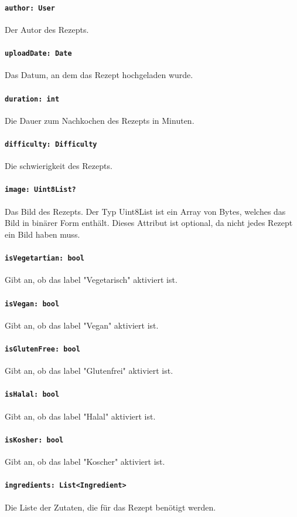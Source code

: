 \documentclass{entwurfsheft}
\begin{document}
\begin{sloppypar}
\paragraph{\texttt{author: User}}
Der Autor des Rezepts.
\paragraph{\texttt{uploadDate: Date}}
Das Datum, an dem das Rezept hochgeladen wurde.
\paragraph{\texttt{duration: int}}
Die Dauer zum Nachkochen des Rezepts in Minuten.
\paragraph{\texttt{difficulty: Difficulty}}
Die \Gls{schwierigkeit} des Rezepts.
\paragraph{\texttt{image: Uint8List?}}
Das Bild des Rezepts. Der Typ Uint8List ist ein Array von Bytes, welches das Bild in binärer Form enthält. Dieses Attribut ist optional, da nicht jedes Rezept ein Bild haben muss.
\paragraph{\texttt{isVegetartian: bool}}
Gibt an, ob das \Gls{label} "Vegetarisch" aktiviert ist.
\paragraph{\texttt{isVegan: bool}}
Gibt an, ob das \Gls{label} "Vegan" aktiviert ist.
\paragraph{\texttt{isGlutenFree: bool}}
Gibt an, ob das \Gls{label} "Glutenfrei" aktiviert ist.
\paragraph{\texttt{isHalal: bool}}
Gibt an, ob das \Gls{label} "Halal" aktiviert ist.
\paragraph{\texttt{isKosher: bool}}
Gibt an, ob das \Gls{label} "Koscher" aktiviert ist.
\paragraph{\texttt{ingredients: List<Ingredient>}}
Die Liste der Zutaten, die für das Rezept benötigt werden.

\end{sloppypar}
\end{document}
